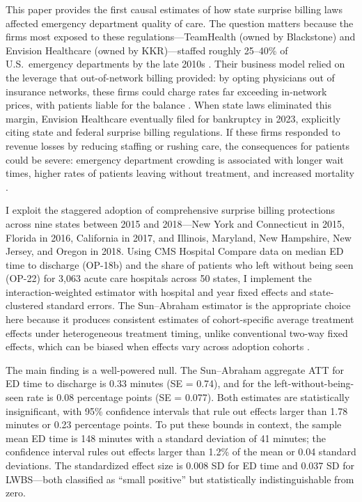 \documentclass[12pt]{article}
\begin{document}
This paper provides the first causal estimates of how state surprise billing laws affected emergency department quality of care. The question matters because the firms most exposed to these regulations---TeamHealth (owned by Blackstone) and Envision Healthcare (owned by KKR)---staffed roughly 25--40\% of U.S.\ emergency departments by the late 2010s \citep{cooperFiscella2024, singhal2019}. Their business model relied on the leverage that out-of-network billing provided: by opting physicians out of insurance networks, these firms could charge rates far exceeding in-network prices, with patients liable for the balance \citep{garmon2019healthcare}. When state laws eliminated this margin, Envision Healthcare eventually filed for bankruptcy in 2023, explicitly citing state and federal surprise billing regulations. If these firms responded to revenue losses by reducing staffing or rushing care, the consequences for patients could be severe: emergency department crowding is associated with longer wait times, higher rates of patients leaving without treatment, and increased mortality \citep{bernstein2009, singer2011}.

I exploit the staggered adoption of comprehensive surprise billing protections across nine states between 2015 and 2018---New York and Connecticut in 2015, Florida in 2016, California in 2017, and Illinois, Maryland, New Hampshire, New Jersey, and Oregon in 2018. Using CMS Hospital Compare data on median ED time to discharge (OP-18b) and the share of patients who left without being seen (OP-22) for 3,063 acute care hospitals across 50 states, I implement the \citet{sun2021estimating} interaction-weighted estimator with hospital and year fixed effects and state-clustered standard errors. The Sun--Abraham estimator is the appropriate choice here because it produces consistent estimates of cohort-specific average treatment effects under heterogeneous treatment timing, unlike conventional two-way fixed effects, which can be biased when effects vary across adoption cohorts \citep{goodmanBacon2021, roth2023pretest}.

The main finding is a well-powered null. The Sun--Abraham aggregate ATT for ED time to discharge is 0.33 minutes (SE = 0.74), and for the left-without-being-seen rate is 0.08 percentage points (SE = 0.077). Both estimates are statistically insignificant, with 95\% confidence intervals that rule out effects larger than 1.78 minutes or 0.23 percentage points. To put these bounds in context, the sample mean ED time is 148 minutes with a standard deviation of 41 minutes; the confidence interval rules out effects larger than 1.2\% of the mean or 0.04 standard deviations. The standardized effect size is 0.008 SD for ED time and 0.037 SD for LWBS---both classified as ``small positive'' but statistically indistinguishable from zero.
\end{document}
